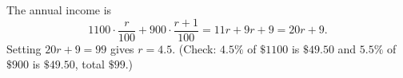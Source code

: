The annual income is
\[
1100\cdot\dfrac{r}{100}+900\cdot\dfrac{r+1}{100}=11r+9r+9=20r+9 .
\]
Setting $20r+9=99$ gives $r=\boxed{4.5}$. (Check: $4.5\%$ of $\$1100$ is $\$49.50$ and $5.5\%$ of $\$900$ is $\$49.50$, total $\$99$.)
